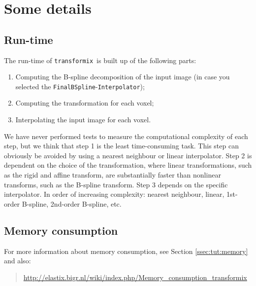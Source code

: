 \documentclass[]{report}
\newcommand{\transformix}{\texttt{transformix}}
\begin{document}
\section{Some details}

\subsection{Run-time}

The run-time of \transformix\ is built up of the following parts:

\begin{enumerate}
\item Computing the B-spline decomposition of the input image (in case you
    selected the \texttt{FinalBSpline}-\texttt{Interpolator});

\item Computing the transformation for each voxel;

\item Interpolating the input image for each voxel.
\end{enumerate}
We have never performed tests to measure the computational
complexity of each step, but we think that step 1 is the least
time-consuming task. This step can obviously be avoided by using a
nearest neighbour or linear interpolator. Step 2 is dependent on the
choice of the transformation, where linear transformations, such as
the rigid and affine transform, are substantially faster than
nonlinear transforms, such as the B-spline transform. Step 3 depends
on the specific interpolator. In order of increasing complexity:
nearest neighbour, linear, 1st-order B-spline, 2nd-order B-spline,
etc.


\subsection{Memory consumption}

For more information about memory consumption, see Section
\ref{ssec:tut:memory} and also:
\begin{quote}
\url{http://elastix.bigr.nl/wiki/index.php/Memory_consumption_transformix}
\end{quote}

\end{document}
